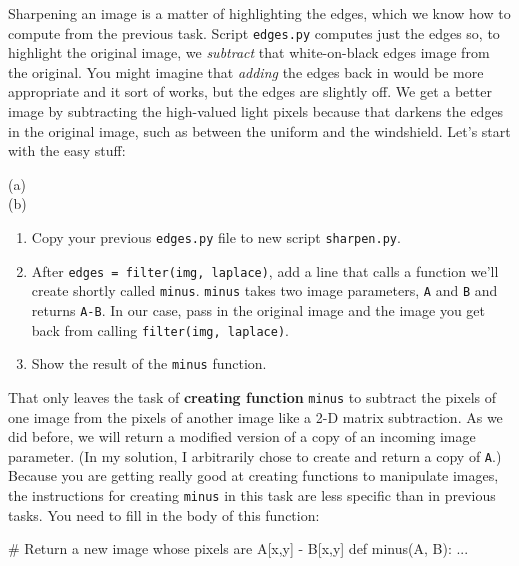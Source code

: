 \documentclass[titlepage]{tufte-book}
\begin{document}
Sharpening an image is a matter of highlighting the edges, which we know how to compute from the previous task. Script {\tt edges.py} computes just the edges so, to highlight the original image, we {\em subtract} that white-on-black edges image from the original.  You might imagine that {\em adding} the edges back in would be more appropriate and it sort of works, but the edges are slightly off. We get a better image by subtracting the high-valued light pixels because that darkens the edges in the original image, such as between the uniform and the windshield. Let's start with the easy stuff:

\begin{marginfigure}
\begin{center}
(a) \\
(b) 
\end{center}
\caption{Bonkers the cat portrait. (a) original and (b) sharpened as computed by {\tt sharpen.py}.}
\label{jeepedges}
\end{marginfigure}

\begin{enumerate}
\item Copy your previous {\tt edges.py} file to new script {\tt sharpen.py}.
\item After {\tt edges = filter(img, laplace)}, add a line that calls a function we'll create shortly called {\tt minus}. {\tt minus} takes two image parameters, {\tt A} and {\tt B} and returns {\tt A-B}.  In our case, pass in the original image and the image you get back from calling {\tt filter(img, laplace)}.
\item Show the result of the {\tt minus} function.
\end{enumerate}

That only leaves the task of {\bf creating function} {\tt minus} to subtract the pixels of one image from the pixels of another image like a 2-D matrix subtraction.  As we did before, we will return a modified version of a copy of an incoming image parameter. (In my solution, I arbitrarily chose to create and return a copy of {\tt A}.) Because you are getting really good at creating functions to manipulate images, the instructions for creating {\tt minus} in this  task are less specific than in previous tasks.  You need to fill in the body of this function:
 
\begin{pyverbatim}
# Return a new image whose pixels are A[x,y] - B[x,y]
def minus(A, B):
	...
\end{pyverbatim}
\end{document}
